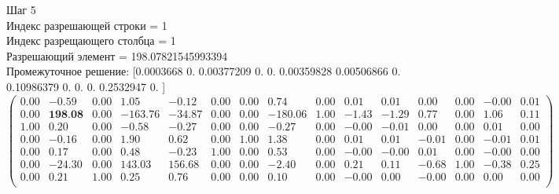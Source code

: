 \documentclass{article}
\begin{document}
\begin{flushleft}
    Шаг 5\\
    Индекс разрешающей строки = 1\\
    Индекс разрещающего столбца = 1\\
    Разрешающий элемент = 198.07821545993394\\
    Промежуточное решение:
    [0.0003668  0.         0.00377209 0.         0.         0.00359828
    0.00506866 0.         0.10986379 0.         0.         0.
    0.2532947  0.        ]
\begin{equation*}
\begin{pmatrix}
 0.00 &  -0.59 & 0.00 &    1.05 &  -0.12 & 0.00 & 0.00 &    0.74 & 0.00 &  0.01 &  0.01 &  0.00 & 0.00 & -0.00 & 0.01 \\
 0.00 & \textbf{198.08} & 0.00 & -163.76 & -34.87 & 0.00 & 0.00 & -180.06 & 1.00 & -1.43 & -1.29 &  0.77 & 0.00 &  1.06 & 0.11 \\
 1.00 &   0.20 & 0.00 &   -0.58 &  -0.27 & 0.00 & 0.00 &   -0.27 & 0.00 & -0.00 & -0.01 &  0.00 & 0.00 &  0.01 & 0.00 \\
 0.00 &  -0.16 & 0.00 &    1.90 &   0.62 & 0.00 & 1.00 &    1.38 & 0.00 &  0.01 &  0.01 & -0.01 & 0.00 & -0.01 & 0.01 \\
 0.00 &   0.17 & 0.00 &    0.48 &  -0.23 & 1.00 & 0.00 &    0.53 & 0.00 & -0.00 & -0.00 &  0.01 & 0.00 & -0.00 & 0.00 \\
 0.00 & -24.30 & 0.00 &  143.03 & 156.68 & 0.00 & 0.00 &   -2.40 & 0.00 &  0.21 &  0.11 & -0.68 & 1.00 & -0.38 & 0.25 \\
 0.00 &   0.21 & 1.00 &    0.25 &   0.76 & 0.00 & 0.00 &    0.10 & 0.00 & -0.00 &  0.00 & -0.00 & 0.00 &  0.00 & 0.00 \\
\end{pmatrix}
\end{equation*}
\end{flushleft}
\end{document}
